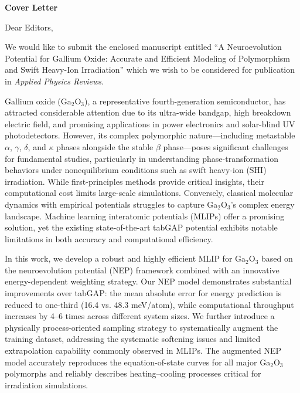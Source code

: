 \documentclass[12pt]{article}
\begin{document}
\begin{center}
\textbf{\Large Cover Letter}
\end{center}

\vspace{1em}

Dear Editors,

We would like to submit the enclosed manuscript entitled ``A Neuroevolution Potential for Gallium Oxide: Accurate and Efficient Modeling of Polymorphism and Swift Heavy-Ion Irradiation'' which we wish to be considered for publication in \textit{Applied Physics Reviews}.

Gallium oxide (Ga$_2$O$_3$), a representative fourth-generation semiconductor, has attracted considerable attention due to its ultra-wide bandgap, high breakdown electric field, and promising applications in power electronics and solar-blind UV photodetectors. However, its complex polymorphic nature---including metastable $\alpha$, $\gamma$, $\delta$, and $\kappa$ phases alongside the stable $\beta$ phase---poses significant challenges for fundamental studies, particularly in understanding phase-transformation behaviors under nonequilibrium conditions such as swift heavy-ion (SHI) irradiation. While first-principles methods provide critical insights, their computational cost limits large-scale simulations. Conversely, classical molecular dynamics with empirical potentials struggles to capture Ga$_2$O$_3$'s complex energy landscape. Machine learning interatomic potentials (MLIPs) offer a promising solution, yet the existing state-of-the-art tabGAP potential exhibits notable limitations in both accuracy and computational efficiency.

In this work, we develop a robust and highly efficient MLIP for Ga$_2$O$_3$ based on the neuroevolution potential (NEP) framework combined with an innovative energy-dependent weighting strategy. Our NEP model demonstrates substantial improvements over tabGAP: the mean absolute error for energy prediction is reduced to one-third (16.4 vs. 48.3 meV/atom), while computational throughput increases by 4--6 times across different system sizes. We further introduce a physically process-oriented sampling strategy to systematically augment the training dataset, addressing the systematic softening issues and limited extrapolation capability commonly observed in MLIPs. The augmented NEP model accurately reproduces the equation-of-state curves for all major Ga$_2$O$_3$ polymorphs and reliably describes heating--cooling processes critical for irradiation simulations.
\end{document}
